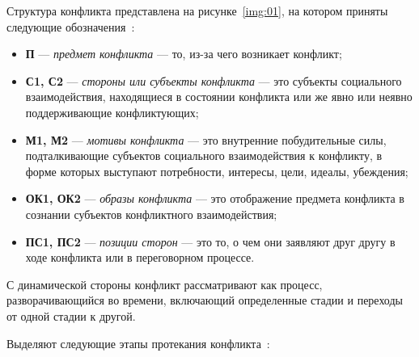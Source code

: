 Структура конфликта представлена на рисунке~\ref{img:01}, на котором
приняты следующие обозначения~\cite{book03}:
\begin{itemize}
    \item \textbf{П} --- \textit{предмет конфликта} --- то, из-за чего возникает
        конфликт;
    \item \textbf{С1, С2} --- \textit{стороны или субъекты конфликта} ---
        это субъекты социального взаимодействия, находящиеся в
        состоянии конфликта или же явно или неявно поддерживающие
        конфликтующих;
    \item \textbf{М1, М2} --- \textit{мотивы конфликта} --- это внутренние
        побудительные силы, подталкивающие субъектов социального взаимодействия
        к конфликту, в форме которых выступают потребности, интересы,
        цели, идеалы, убеждения;
    \item \textbf{ОК1, ОК2} --- \textit{образы конфликта} --- это
        отображение предмета конфликта в сознании субъектов конфликтного
        взаимодействия;
    \item \textbf{ПС1, ПС2} --- \textit{позиции сторон} --- это то,
        о чем они заявляют друг другу в ходе конфликта или в переговорном
        процессе.
\end{itemize}


С динамической стороны конфликт рассматривают как процесс,
разворачивающийся во времени, включающий определенные стадии и переходы от
одной стадии к другой.

Выделяют следующие этапы протекания конфликта~\cite{art01}:

